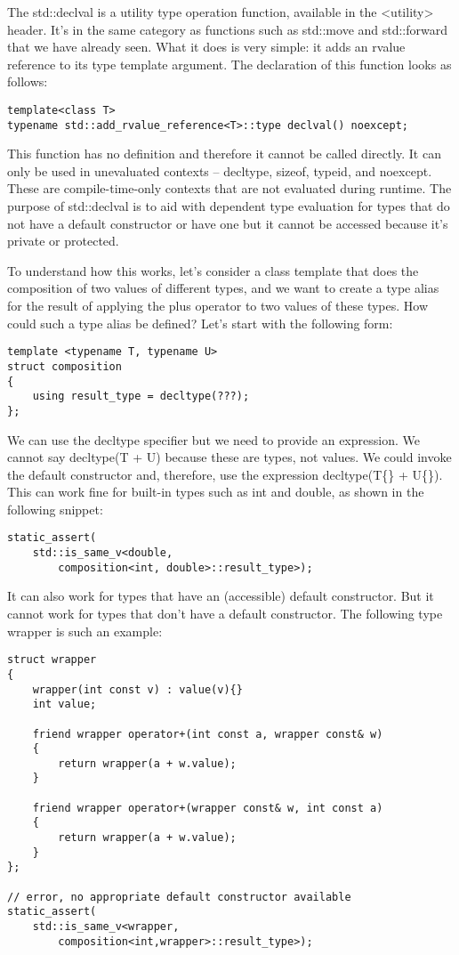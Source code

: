 The std::declval is a utility type operation function, available in the <utility> header. It’s in the same category as functions such as std::move and std::forward that we have already seen. What it does is very simple: it adds an rvalue reference to its type template argument. The declaration of this function looks as follows:

\begin{lstlisting}[style=styleCXX]
template<class T>
typename std::add_rvalue_reference<T>::type declval() noexcept;
\end{lstlisting}

This function has no definition and therefore it cannot be called directly. It can only be used in unevaluated contexts – decltype, sizeof, typeid, and noexcept. These are compile-time-only contexts that are not evaluated during runtime. The purpose of std::declval is to aid with dependent type evaluation for types that do not have a default constructor or have one but it cannot be accessed because it’s private or protected.

To understand how this works, let’s consider a class template that does the composition of two values of different types, and we want to create a type alias for the result of applying the plus operator to two values of these types. How could such a type alias be defined?
Let’s start with the following form:

\begin{lstlisting}[style=styleCXX]
template <typename T, typename U>
struct composition
{
	using result_type = decltype(???);
};
\end{lstlisting}

We can use the decltype specifier but we need to provide an expression. We cannot say decltype(T + U) because these are types, not values. We could invoke the default constructor and, therefore, use the expression decltype(T\{\} + U\{\}). This can work fine for built-in types such as int and double, as shown in the following snippet:

\begin{lstlisting}[style=styleCXX]
static_assert(
	std::is_same_v<double,
		composition<int, double>::result_type>);
\end{lstlisting}

It can also work for types that have an (accessible) default constructor. But it cannot work for types that don’t have a default constructor. The following type wrapper is such an example:

\begin{lstlisting}[style=styleCXX]
struct wrapper
{
	wrapper(int const v) : value(v){}
	int value;
	
	friend wrapper operator+(int const a, wrapper const& w)
	{
		return wrapper(a + w.value);
	}

	friend wrapper operator+(wrapper const& w, int const a)
	{
		return wrapper(a + w.value);
	}
};

// error, no appropriate default constructor available
static_assert(
	std::is_same_v<wrapper,
		composition<int,wrapper>::result_type>);
\end{lstlisting}

